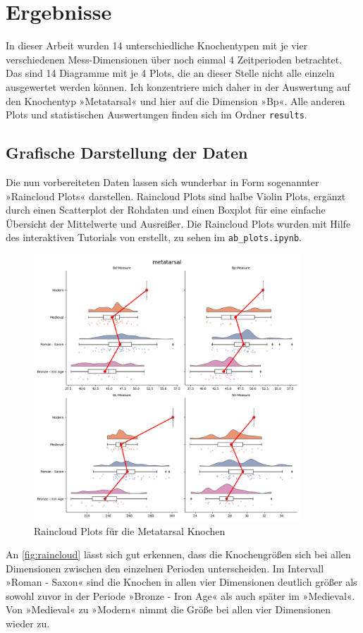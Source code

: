 \section{Ergebnisse}
In dieser Arbeit wurden 14 unterschiedliche Knochentypen mit je vier verschiedenen Mess-Dimensionen über noch einmal 4 Zeitperioden betrachtet. 
Das sind 14 Diagramme mit je 4 Plots, die an dieser Stelle nicht alle einzeln ausgewertet werden können. 
Ich konzentriere mich daher in der Auswertung auf den Knochentyp »Metatarsal« und hier auf die Dimension »Bp«.
Alle anderen Plots und statistischen Auswertungen finden sich im Ordner \texttt{results}. 

\subsection{Grafische Darstellung der Daten}
Die nun vorbereiteten Daten lassen sich wunderbar in Form sogenannter »Raincloud Plots«\cite{Allen2021} darstellen. Raincloud Plots sind halbe Violin Plots, ergänzt durch einen Scatterplot der Rohdaten und einen Boxplot für eine einfache Übersicht der Mittelwerte und Ausreißer. 
Die Raincloud Plots wurden mit Hilfe des interaktiven Tutorials von \cite{Allen2021} erstellt, zu sehen im \texttt{ab\_plots.ipynb}.

\begin{figure}[H]
    \centering
    \includegraphics[height=10cm]{results/plots/rainclouds/metatarsal.png}
    \caption{Raincloud Plots für die Metatarsal Knochen}
    \label{fig:raincloud}
\end{figure}

An \autoref{fig:raincloud} lässt sich gut erkennen, dass die Knochengrößen sich bei allen Dimensionen zwischen den einzelnen Perioden unterscheiden. 
Im Intervall »Roman - Saxon« sind die Knochen in allen vier Dimensionen deutlich größer als sowohl zuvor in der Periode »Bronze - Iron Age« als auch später im »Medieval«. 
Von »Medieval« zu »Modern« nimmt die Größe bei allen vier Dimensionen wieder zu.

